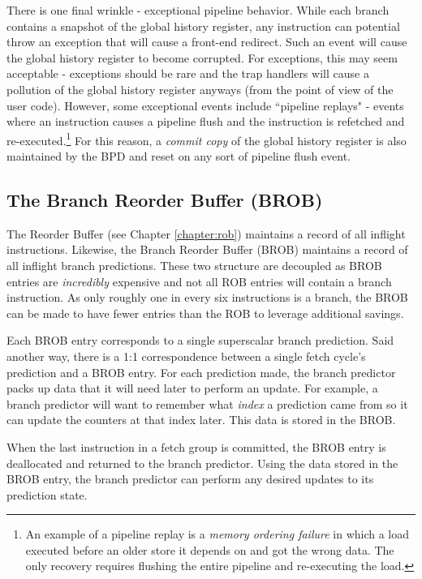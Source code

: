 There is one final wrinkle - exceptional pipeline behavior.  While each branch contains a snapshot of the global history register, any instruction can potential throw an exception that will cause a front-end redirect. Such an event will cause the global history register to become corrupted. For exceptions, this may seem acceptable - exceptions should be rare and the trap handlers will cause a pollution of the global history register anyways (from the point of view of the user code).  However, some exceptional events include ``pipeline replays" - events where an instruction causes a pipeline flush and the instruction is refetched and re-executed.\footnote{An example of a pipeline replay is a {\em memory ordering failure} in which a load executed before an older store it depends on and got the wrong data. The only recovery requires flushing the entire pipeline and re-executing the load.}  For this reason, a {\em commit copy} of the global history register is also maintained by the BPD and reset on any sort of pipeline flush event.

\subsection{The Branch Reorder Buffer (BROB)}\label{sec:brob}

The Reorder Buffer (see Chapter \ref{chapter:rob}) maintains a record of all inflight instructions. Likewise, the Branch Reorder Buffer (BROB) maintains a record of all inflight branch predictions.  These two structure are decoupled as BROB entries are {\em incredibly} expensive and not all ROB entries will contain a branch instruction. As only roughly one in every six instructions is a branch, the BROB can be made to have fewer entries than the ROB to leverage additional savings.

Each BROB entry corresponds to a single superscalar branch prediction. Said another way, there is a 1:1 correspondence between a single fetch cycle's prediction and a BROB entry.  
For each prediction made, the branch predictor packs up data that it will need later to perform an update. For example, a branch predictor will want to remember what {\em index} a prediction came from so it can update the counters at that index later. This data is stored in the BROB. 

When the last instruction in a fetch group is committed, the BROB entry is deallocated and returned to the branch predictor.  Using the data stored in the BROB entry, the branch predictor can perform any desired updates to its prediction state. 

